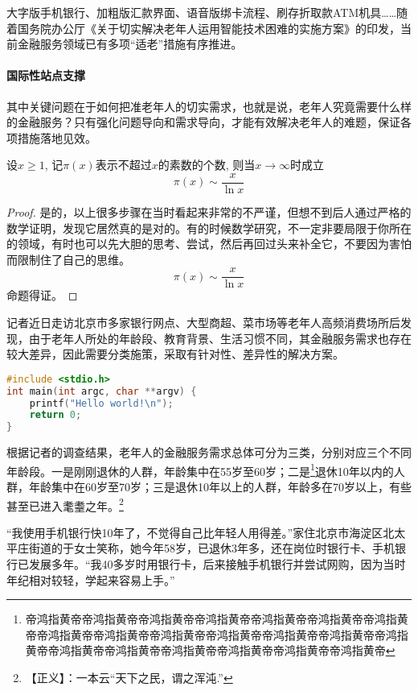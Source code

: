 \documentclass[printMode]{ecnuthesis}
\begin{document}
大字版手机银行、加粗版汇款界面、语音版绑卡流程、刷存折取款ATM机具……随着国务院办公厅《关于切实解决老年人运用智能技术困难的实施方案》的印发，当前金融服务领域已有多项“适老”措施有序推进。

\paragraph{国际性站点支撑}

其中关键问题在于如何把准老年人的切实需求，也就是说，老年人究竟需要什么样的金融服务？只有强化问题导向和需求导向，才能有效解决老年人的难题，保证各项措施落地见效。

\begin{theorem}[素数定理]
  设$x \geqslant 1$, 记$\pi(x)$表示不超过$x$的素数的个数, 则当$x \to \infty$时成立
  \[\pi(x) \sim \frac{x}{\ln x}\]
\end{theorem}

\begin{proof}
  是的，以上很多步骤在当时看起来非常的不严谨，但想不到后人通过严格的数学证明，发现它居然真的是对的。有的时候数学研究，不一定非要局限于你所在的领域，有时也可以先大胆的思考、尝试，然后再回过头来补全它，不要因为害怕而限制住了自己的思维。
  \[\pi(x) \sim \frac{x}{\ln x}\]
  命题得证。
\end{proof}

记者近日走访北京市多家银行网点、大型商超、菜市场等老年人高频消费场所后发现，由于老年人所处的年龄段、教育背景、生活习惯不同，其金融服务需求也存在较大差异，因此需要分类施策，采取有针对性、差异性的解决方案。

\begin{lstlisting}[language=C++]
#include <stdio.h>
int main(int argc, char **argv) {
    printf("Hello world!\n");
    return 0;
}
\end{lstlisting}

根据记者的调查结果，老年人的金融服务需求总体可分为三类，分别对应三个不同年龄段。一是刚刚退休的人群，年龄集中在55岁至60岁；二是\footnote{帝鸿指黄帝帝鸿指黄帝帝鸿指黄帝帝鸿指黄帝帝鸿指黄帝帝鸿指黄帝帝鸿指黄帝帝鸿指黄帝帝鸿指黄帝帝鸿指黄帝帝鸿指黄帝帝鸿指黄帝帝鸿指黄帝帝鸿指黄帝帝鸿指黄帝帝鸿指黄帝帝鸿指黄帝帝鸿指黄帝帝鸿指黄帝帝鸿指黄帝}退休10年以内的人群，年龄集中在60岁至70岁；三是退休10年以上的人群，年龄多在70岁以上，有些甚至已进入耄耋之年。\footnote{【正义】：一本云“天下之民，谓之浑沌.”}

“我使用手机银行快10年了，不觉得自己比年轻人用得差。”家住北京市海淀区北太平庄街道的于女士笑称，她今年58岁，已退休3年多，还在岗位时银行卡、手机银行已发展多年。“我40多岁时用银行卡，后来接触手机银行并尝试网购，因为当时年纪相对较轻，学起来容易上手。”
\end{document}
